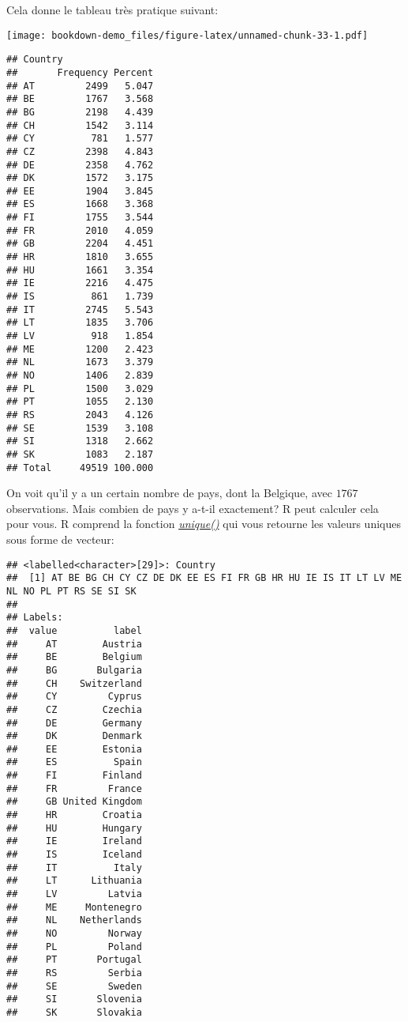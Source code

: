 \documentclass[
]{book}
\newenvironment{Shaded}{\begin{snugshade}}{\end{snugshade}}
\newcommand{\FunctionTok}[1]{\textcolor[rgb]{0.00,0.00,0.00}{#1}}
\newcommand{\NormalTok}[1]{#1}
\newcommand{\SpecialCharTok}[1]{\textcolor[rgb]{0.00,0.00,0.00}{#1}}
\begin{document}
\begin{Shaded}
\end{Shaded}

Cela donne le tableau très pratique suivant:

\texttt{[image: bookdown-demo\_files/figure-latex/unnamed-chunk-33-1.pdf]}

\begin{verbatim}
## Country 
##       Frequency Percent
## AT         2499   5.047
## BE         1767   3.568
## BG         2198   4.439
## CH         1542   3.114
## CY          781   1.577
## CZ         2398   4.843
## DE         2358   4.762
## DK         1572   3.175
## EE         1904   3.845
## ES         1668   3.368
## FI         1755   3.544
## FR         2010   4.059
## GB         2204   4.451
## HR         1810   3.655
## HU         1661   3.354
## IE         2216   4.475
## IS          861   1.739
## IT         2745   5.543
## LT         1835   3.706
## LV          918   1.854
## ME         1200   2.423
## NL         1673   3.379
## NO         1406   2.839
## PL         1500   3.029
## PT         1055   2.130
## RS         2043   4.126
## SE         1539   3.108
## SI         1318   2.662
## SK         1083   2.187
## Total     49519 100.000
\end{verbatim}

On voit qu'il y a un certain nombre de pays, dont la Belgique, avec \(1767\) observations. Mais combien de pays y a-t-il exactement? R peut calculer cela pour vous. R comprend la fonction \href{https://www.rdocumentation.org/packages/base/versions/3.6.2/topics/unique}{\emph{unique()}} qui vous retourne les valeurs uniques sous forme de vecteur:

\begin{Shaded}
\end{Shaded}

\begin{verbatim}
## <labelled<character>[29]>: Country
##  [1] AT BE BG CH CY CZ DE DK EE ES FI FR GB HR HU IE IS IT LT LV ME NL NO PL PT RS SE SI SK
## 
## Labels:
##  value          label
##     AT        Austria
##     BE        Belgium
##     BG       Bulgaria
##     CH    Switzerland
##     CY         Cyprus
##     CZ        Czechia
##     DE        Germany
##     DK        Denmark
##     EE        Estonia
##     ES          Spain
##     FI        Finland
##     FR         France
##     GB United Kingdom
##     HR        Croatia
##     HU        Hungary
##     IE        Ireland
##     IS        Iceland
##     IT          Italy
##     LT      Lithuania
##     LV         Latvia
##     ME     Montenegro
##     NL    Netherlands
##     NO         Norway
##     PL         Poland
##     PT       Portugal
##     RS         Serbia
##     SE         Sweden
##     SI       Slovenia
##     SK       Slovakia
\end{verbatim}
\end{document}
